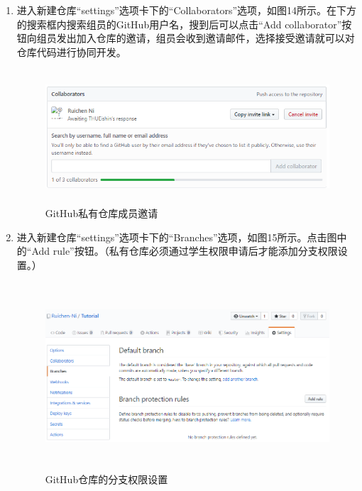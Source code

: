\documentclass[a4paper,14pt]{article}
\begin{document}
\begin{enumerate}[1. ]
\item 进入新建仓库“settings”选项卡下的“Collaborators”选项，如图14所示。在下方的搜索框内搜索组员的GitHub用户名，搜到后可以点击“Add collaborator”按钮向组员发出加入仓库的邀请，组员会收到邀请邮件，选择接受邀请就可以对仓库代码进行协同开发。
\begin{figure}[h]
\centering
\includegraphics[height=5cm]{figure/collab}
\caption{GitHub私有仓库成员邀请}
\end{figure}
\item 进入新建仓库“settings”选项卡下的“Branches”选项，如图15所示。点击图中的“Add rule”按钮。（私有仓库必须通过学生权限申请后才能添加分支权限设置。）
\begin{figure}[h]
\centering
\includegraphics[height=7cm]{figure/branch_rule_set}
\caption{GitHub仓库的分支权限设置}
\end{figure}
\newpage
\quad

\quad

\quad


\end{enumerate}
\end{document}
